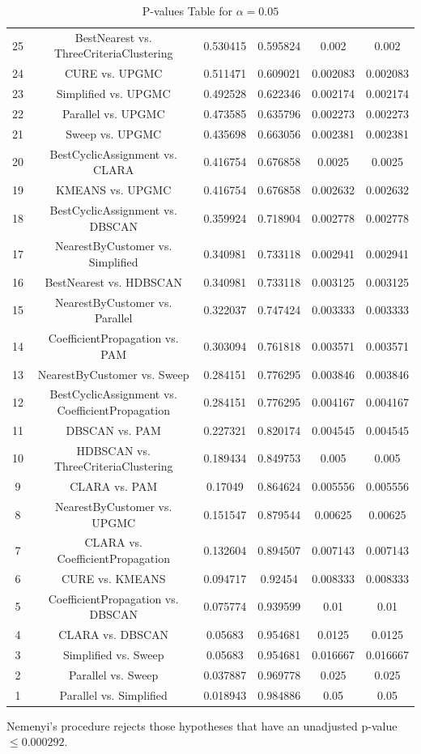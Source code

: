 \documentclass[a4paper,10pt]{article}
\begin{document}
\begin{landscape}
\begin{table}[!htp]
\begin{tabular}{cccccc}
25&BestNearest vs. ThreeCriteriaClustering&0.530415&0.595824&0.002&0.002\\
24&CURE vs. UPGMC&0.511471&0.609021&0.002083&0.002083\\
23&Simplified vs. UPGMC&0.492528&0.622346&0.002174&0.002174\\
22&Parallel vs. UPGMC&0.473585&0.635796&0.002273&0.002273\\
21&Sweep vs. UPGMC&0.435698&0.663056&0.002381&0.002381\\
20&BestCyclicAssignment vs. CLARA&0.416754&0.676858&0.0025&0.0025\\
19&KMEANS vs. UPGMC&0.416754&0.676858&0.002632&0.002632\\
18&BestCyclicAssignment vs. DBSCAN&0.359924&0.718904&0.002778&0.002778\\
17&NearestByCustomer vs. Simplified&0.340981&0.733118&0.002941&0.002941\\
16&BestNearest vs. HDBSCAN&0.340981&0.733118&0.003125&0.003125\\
15&NearestByCustomer vs. Parallel&0.322037&0.747424&0.003333&0.003333\\
14&CoefficientPropagation vs. PAM&0.303094&0.761818&0.003571&0.003571\\
13&NearestByCustomer vs. Sweep&0.284151&0.776295&0.003846&0.003846\\
12&BestCyclicAssignment vs. CoefficientPropagation&0.284151&0.776295&0.004167&0.004167\\
11&DBSCAN vs. PAM&0.227321&0.820174&0.004545&0.004545\\
10&HDBSCAN vs. ThreeCriteriaClustering&0.189434&0.849753&0.005&0.005\\
9&CLARA vs. PAM&0.17049&0.864624&0.005556&0.005556\\
8&NearestByCustomer vs. UPGMC&0.151547&0.879544&0.00625&0.00625\\
7&CLARA vs. CoefficientPropagation&0.132604&0.894507&0.007143&0.007143\\
6&CURE vs. KMEANS&0.094717&0.92454&0.008333&0.008333\\
5&CoefficientPropagation vs. DBSCAN&0.075774&0.939599&0.01&0.01\\
4&CLARA vs. DBSCAN&0.05683&0.954681&0.0125&0.0125\\
3&Simplified vs. Sweep&0.05683&0.954681&0.016667&0.016667\\
2&Parallel vs. Sweep&0.037887&0.969778&0.025&0.025\\
1&Parallel vs. Simplified&0.018943&0.984886&0.05&0.05\\
\hline
\end{tabular}
\caption{P-values Table for $\alpha=0.05$}
\end{table}Nemenyi's procedure rejects those hypotheses that have an unadjusted p-value $\le0.000292$.


\end{landscape}
\end{document}
